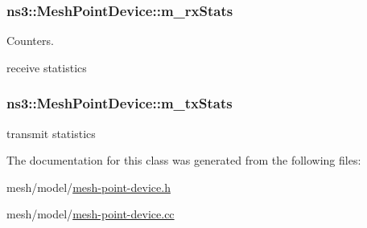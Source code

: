 \subsubsection[{\texorpdfstring{m\+\_\+rx\+Stats}{m_rxStats}}]{ ns3\+::\+Mesh\+Point\+Device\+::m\+\_\+rx\+Stats\hspace{0.3cm}{\ttfamily [private]}}\hypertarget{classns3_1_1MeshPointDevice_aa10107ad81c4b24d391dcd8520152bf8}{}\label{classns3_1_1MeshPointDevice_aa10107ad81c4b24d391dcd8520152bf8}


Counters. 

receive statistics 
\subsubsection[{\texorpdfstring{m\+\_\+tx\+Stats}{m_txStats}}]{ ns3\+::\+Mesh\+Point\+Device\+::m\+\_\+tx\+Stats\hspace{0.3cm}{\ttfamily [private]}}\hypertarget{classns3_1_1MeshPointDevice_abbd06f2b215c772004661d6bdb156a31}{}\label{classns3_1_1MeshPointDevice_abbd06f2b215c772004661d6bdb156a31}


transmit statistics 



The documentation for this class was generated from the following files\+:\begin{DoxyCompactItemize}
\item 
mesh/model/\hyperlink{mesh-point-device_8h}{mesh-\/point-\/device.\+h}\item 
mesh/model/\hyperlink{mesh-point-device_8cc}{mesh-\/point-\/device.\+cc}\end{DoxyCompactItemize}
